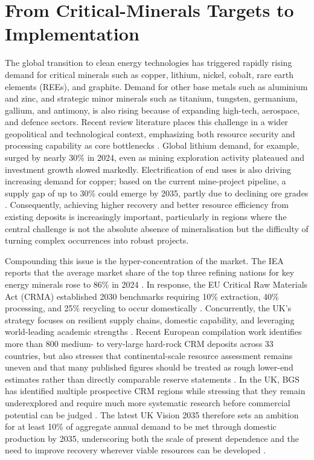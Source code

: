 \documentclass[12pt,a4paper]{article}
\begin{document}
\section{From Critical-Minerals Targets to Implementation}
The global transition to clean energy technologies has triggered rapidly rising demand for critical minerals such as copper, lithium, nickel, cobalt, rare earth elements (REEs), and graphite. Demand for other base metals such as aluminium and zinc, and strategic minor minerals such as titanium, tungsten, germanium, gallium, and antimony, is also rising because of expanding high-tech, aerospace, and defence sectors. Recent review literature places this challenge in a wider geopolitical and technological context, emphasizing both resource security and processing capability as core bottlenecks \cite{reich_critical_2025}. Global lithium demand, for example, surged by nearly 30\% in 2024, even as mining exploration activity plateaued and investment growth slowed markedly. Electrification of end uses is also driving increasing demand for copper; based on the current mine-project pipeline, a supply gap of up to 30\% could emerge by 2035, partly due to declining ore grades \cite{iea_outlook_2025}. Consequently, achieving higher recovery and better resource efficiency from existing deposits is increasingly important, particularly in regions where the central challenge is not the absolute absence of mineralisation but the difficulty of turning complex occurrences into robust projects.

Compounding this issue is the hyper-concentration of the market. The IEA reports that the average market share of the top three refining nations for key energy minerals rose to 86\% in 2024 \cite{iea_outlook_2025}. In response, the EU Critical Raw Materials Act (CRMA) established 2030 benchmarks requiring 10\% extraction, 40\% processing, and 25\% recycling to occur domestically \cite{eu_crma_2024}. Concurrently, the UK's strategy focuses on resilient supply chains, domestic capability, and leveraging world-leading academic strengths \cite{uk_strategy_2022}. Recent European compilation work identifies more than 800 medium- to very-large hard-rock CRM deposits across 33 countries, but also stresses that continental-scale resource assessment remains uneven and that many published figures should be treated as rough lower-end estimates rather than directly comparable reserve statements \cite{albert_crm_europe_2025}. In the UK, BGS has identified multiple prospective CRM regions while stressing that they remain underexplored and require much more systematic research before commercial potential can be judged \cite{bgs_uk_crm_2022}. The latest UK Vision 2035 therefore sets an ambition for at least 10\% of aggregate annual demand to be met through domestic production by 2035, underscoring both the scale of present dependence and the need to improve recovery wherever viable resources can be developed \cite{uk_vision_2035_2026}.
\end{document}
